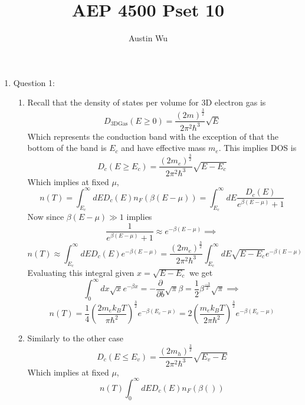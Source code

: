 \documentclass[12pt]{amsart}
\title{AEP 4500 Pset 10}
\author{Austin Wu}
\begin{document}
\maketitle
\begin{enumerate}
  \item Question 1:
  \begin{enumerate}
    \item Recall that the density of states per volume for 3D electron gas is
      \[D_\text{3DGas}(E\geq0)= \frac{(2m)^\frac{3}{2}}{2\pi^2\hbar^3}\sqrt{E}\]
      Which represents the conduction band with the exception of that the bottom of the band is $E_c$ and have effective mass $m_e$. This implies DOS is
      \[D_c(E\geq E_c) = \frac{(2m_e)^\frac{3}{2}}{2\pi^2\hbar^3}\sqrt{E-E_c}\]
      Which implies at fixed $\mu$, 
      \[n(T) = \int_{E_c}^\infty dE D_c(E)n_F(\beta(E-\mu)) = \int_{E_c}^\infty dE \frac{D_c(E)}{e^{\beta(E-\mu)}+1}\]
      Now since $\beta(E-\mu) \gg 1$ implies
      \[\frac{1}{e^{\beta(E-\mu)}+1} \approx e^{-\beta(E-\mu)}\implies\]
      \[n(T) \approx \int_{E_c}^\infty dE D_c(E)e^{-\beta(E-\mu)} = \frac{(2m_e)^\frac{3}{2}}{2\pi^2\hbar^3} \int_{E_c}^\infty dE \sqrt{E-E_c}e^{-\beta(E-\mu)}\]
      Evaluating this integral given $x=\sqrt{E-E_c}$ we get
      \[\int_0^\infty dx\sqrt{x}e^{-\beta x} = -\displaystyle\frac{\partial}{\partial b}\sqrt{\pi}{\beta} = \frac{1}{2}\beta^\frac{-3}{2}\sqrt{\pi} \implies\]
      \[n(T) = \frac{1}{4}(\frac{2m_ek_BT}{\pi\hbar^2})^\frac{3}{2}e^{-\beta(E_c-\mu)} = 2(\frac{m_ek_BT}{2\pi\hbar^2})^\frac{3}{2}e^{-\beta(E_c-\mu)}\]
    \item Similarly to the other case 
    \[D_c(E \leq E_v) = \frac{(2m_h)^\frac{3}{2}}{2\pi^2\hbar^3}\sqrt{E_v-E}\]
    Which implies at fixed $\mu$, 
    \[n(T) \int_0^\infty dE D_c(E)n_F(\beta())\]
  \end{enumerate}
\end{enumerate} 
\end{document}
